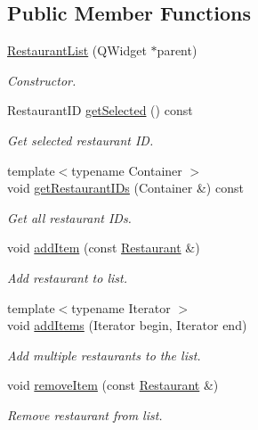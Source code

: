 \subsection*{Public Member Functions}
\begin{DoxyCompactItemize}
\item 
\hyperlink{classRestaurantList_a233e9bb9c25a1531d754459f8e0eef81}{Restaurant\-List} (Q\-Widget $\ast$parent)
\begin{DoxyCompactList}\small\item\em Constructor. \end{DoxyCompactList}\item 
Restaurant\-I\-D \hyperlink{classRestaurantList_a4427f0f8f4b09d830de4687588b2fd72}{get\-Selected} () const 
\begin{DoxyCompactList}\small\item\em Get selected restaurant I\-D. \end{DoxyCompactList}\item 
{\footnotesize template$<$typename Container $>$ }\\void \hyperlink{classRestaurantList_a72fce6ff45c3cceaa794d32e9118fe2d}{get\-Restaurant\-I\-Ds} (Container \&) const 
\begin{DoxyCompactList}\small\item\em Get all restaurant I\-Ds. \end{DoxyCompactList}\item 
void \hyperlink{classRestaurantList_a174ca2fb41584d6e674cfa1c79833fbd}{add\-Item} (const \hyperlink{classRestaurant}{Restaurant} \&)
\begin{DoxyCompactList}\small\item\em Add restaurant to list. \end{DoxyCompactList}\item 
{\footnotesize template$<$typename Iterator $>$ }\\void \hyperlink{classRestaurantList_aeb4247604bf1ea14b33878c7ffc43ac4}{add\-Items} (Iterator begin, Iterator end)
\begin{DoxyCompactList}\small\item\em Add multiple restaurants to the list. \end{DoxyCompactList}\item 
void \hyperlink{classRestaurantList_ae29016217ee9c4d9517f5b384feb450c}{remove\-Item} (const \hyperlink{classRestaurant}{Restaurant} \&)
\begin{DoxyCompactList}\small\item\em Remove restaurant from list. \end{DoxyCompactList}\item 

\end{DoxyCompactItemize}
